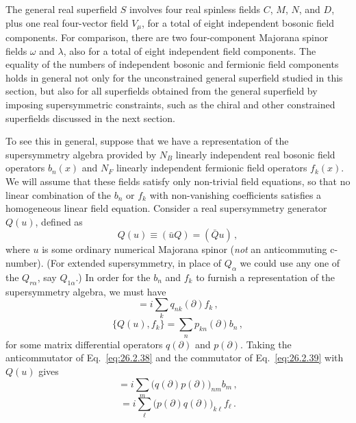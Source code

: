 The general real superfield $S$ involves four real spinless fields $C$, $M$,
$N$, and $D$, plus one real four-vector field $V_\mu$, for a total of eight
independent bosonic field components. For comparison, there are two
four-component Majorana spinor fields $\omega$ and $\lambda$, also for a total
of eight independent field components. The equality of the numbers of
independent bosonic and fermionic field components holds in general not only
for the unconstrained general superfield studied in this section, but also for
all superfields obtained from the general superfield by imposing
supersymmetric constraints, such as the chiral and other constrained
superfields discussed in the next section.

To see this in general, suppose that we have a representation of the
supersymmetry algebra provided by $N_B$ linearly independent real bosonic
field operators $b_n(x)$ and $N_F$ linearly independent fermionic field
operators $f_k(x)$. We will assume that these fields satisfy only non-trivial
field equations, so that no linear combination of the $b_n$ or $f_k$ with
non-vanishing coefficients satisfies a homogeneous linear field equation.
Consider a real supersymmetry generator $Q(u)$, defined as
\begin{equation}
  Q(u)\equiv(\bar uQ)=(\bar Qu)\,,
  \tag{26.2.37}\label{eq:26.2.37}
\end{equation}
where $u$ is some ordinary numerical Majorana spinor (\emph{not} an
anticommuting c-number). (For extended supersymmetry, in place of $Q_\alpha$
we could use any one of the $Q_{r\alpha}$, say $Q_{1\alpha}$.) In order for
the $b_n$ and $f_k$ to furnish a representation of the supersymmetry algebra,
we must have
\begin{equation}
  [Q(u),b_n]=i\sum_k q_{nk}(\partial)f_k\,,
  \tag{26.2.38}\label{eq:26.2.38}
\end{equation}
\begin{equation}
  \{Q(u),f_k\}=\sum_n p_{kn}(\partial)b_n\,,
  \tag{26.2.39}\label{eq:26.2.39}
\end{equation}
for some matrix differential operators $q(\partial)$ and $p(\partial)$.
Taking the anticommutator of Eq.~\eqref{eq:26.2.38} and the commutator of
Eq.~\eqref{eq:26.2.39} with $Q(u)$ gives
\begin{equation}
  [Q^2(u),b_n]
  =i\sum_m\bigl(q(\partial)p(\partial)\bigr)_{nm}b_m\,,
  \tag{26.2.40}\label{eq:26.2.40}
\end{equation}
\begin{equation}
  [Q^2(u),f_k]
  =i\sum_\ell\bigl(p(\partial)q(\partial)\bigr)_{k\ell}f_\ell\,.
  \tag{26.2.41}\label{eq:26.2.41}
\end{equation}
